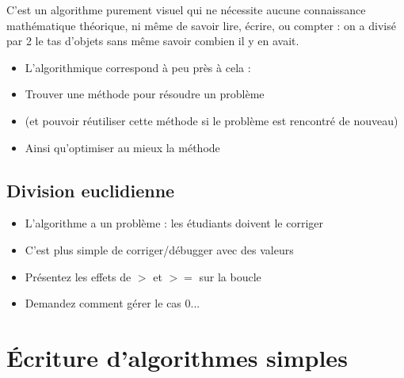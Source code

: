 \documentclass[11pt,a4paper]{article}
\begin{document}
\bigskip

C'est un algorithme purement visuel qui ne nécessite aucune connaissance mathématique théorique, ni même de savoir lire, écrire, ou compter : on a divisé par 2 le tas d'objets sans même savoir combien il y en avait.

\bigskip

\begin{itemize}
\item L'algorithmique correspond à peu près à cela :
\item Trouver une méthode pour résoudre un problème
\item (et pouvoir réutiliser cette méthode si le problème est rencontré de nouveau)
\item Ainsi qu'optimiser au mieux la méthode
\end{itemize}


\clearpage


\subsection{Division euclidienne}

\bigskip

\begin{itemize}
\item L'algorithme a un problème : les étudiants doivent le corriger
\item C'est plus simple de corriger/débugger avec des valeurs
\end{itemize}

\bigskip

\begin{itemize}
\item Présentez les effets de $ > $ et $ >= $ sur la boucle
\item Demandez comment gérer le cas 0...
\end{itemize}


\vspace*{1.5cm}


\section{\'Ecriture d'algorithmes simples}

\bigskip

\end{document}
